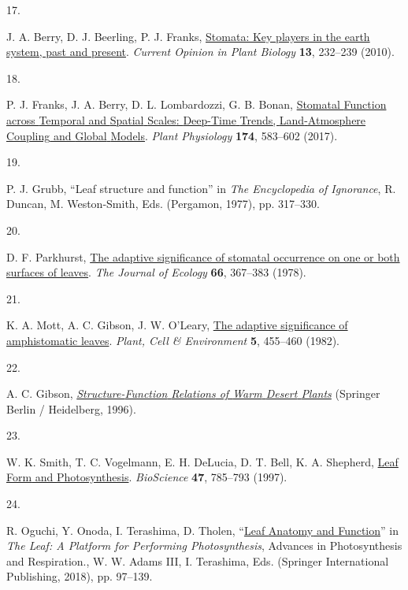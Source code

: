 \documentclass[
  letterpaper,
  DIV=11,
  numbers=noendperiod]{scrartcl}
\newlength{\cslhangindent}
\newlength{\csllabelwidth}
\newenvironment{CSLReferences}[2] %
 {\begin{list}{}{%
  \setlength{\itemindent}{0pt}
  \setlength{\leftmargin}{0pt}
  \setlength{\parsep}{0pt}
  \ifodd #1
   \setlength{\leftmargin}{\cslhangindent}
   \setlength{\itemindent}{-1\cslhangindent}
  \fi
  \setlength{\itemsep}{#2\baselineskip}}}
 {\end{list}}
\newcommand{\CSLLeftMargin}[1]{\parbox[t]{\csllabelwidth}{\strut#1\strut}}
\newcommand{\CSLRightInline}[1]{\parbox[t]{\linewidth - \csllabelwidth}{\strut#1\strut}}
\begin{document}
\begin{CSLReferences}{0}{1}
\CSLLeftMargin{17. }%
\CSLRightInline{J. A. Berry, D. J. Beerling, P. J. Franks,
\href{https://doi.org/10.1016/j.pbi.2010.04.013}{Stomata: Key players in
the earth system, past and present}. \emph{Current Opinion in Plant
Biology} \textbf{13}, 232--239 (2010).}

\CSLLeftMargin{18. }%
\CSLRightInline{P. J. Franks, J. A. Berry, D. L. Lombardozzi, G. B.
Bonan, \href{https://doi.org/10.1104/pp.17.00287}{Stomatal {Function}
across {Temporal} and {Spatial} {Scales}: {Deep}-{Time} {Trends},
{Land}-{Atmosphere} {Coupling} and {Global} {Models}}. \emph{Plant
Physiology} \textbf{174}, 583--602 (2017).}

\CSLLeftMargin{19. }%
\CSLRightInline{P. J. Grubb, {``Leaf structure and function''} in
\emph{The Encyclopedia of Ignorance}, R. Duncan, M. Weston-Smith, Eds.
(Pergamon, 1977), pp. 317--330.}

\CSLLeftMargin{20. }%
\CSLRightInline{D. F. Parkhurst,
\href{https://doi.org/10.2307/2259142}{The adaptive significance of
stomatal occurrence on one or both surfaces of leaves}. \emph{The
Journal of Ecology} \textbf{66}, 367--383 (1978).}

\CSLLeftMargin{21. }%
\CSLRightInline{K. A. Mott, A. C. Gibson, J. W. O'Leary,
\href{https://doi.org/10.1111/1365-3040.ep11611750}{The adaptive
significance of amphistomatic leaves}. \emph{Plant, Cell \& Environment}
\textbf{5}, 455--460 (1982).}

\CSLLeftMargin{22. }%
\CSLRightInline{A. C. Gibson,
\emph{\href{http://public.eblib.com/choice/PublicFullRecord.aspx?p=6495247}{Structure-{Function}
{Relations} of {Warm} {Desert} {Plants}}} (Springer Berlin / Heidelberg,
1996).}

\CSLLeftMargin{23. }%
\CSLRightInline{W. K. Smith, T. C. Vogelmann, E. H. DeLucia, D. T. Bell,
K. A. Shepherd, \href{https://doi.org/10.2307/1313100}{Leaf {Form} and
{Photosynthesis}}. \emph{BioScience} \textbf{47}, 785--793 (1997).}

\CSLLeftMargin{24. }%
\CSLRightInline{R. Oguchi, Y. Onoda, I. Terashima, D. Tholen,
{``\href{https://doi.org/10.1007/978-3-319-93594-2_5}{Leaf {Anatomy} and
{Function}}''} in \emph{The {Leaf}: {A} {Platform} for {Performing}
{Photosynthesis}}, Advances in {Photosynthesis} and {Respiration}., W.
W. Adams III, I. Terashima, Eds. (Springer International Publishing,
2018), pp. 97--139.}


\end{CSLReferences}
\end{document}
